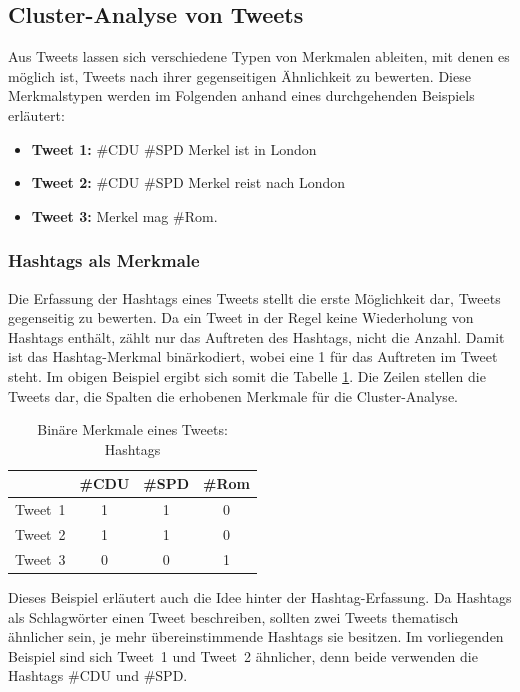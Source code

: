 \subsection{Cluster-Analyse von Tweets} \label{subsec:ClusterTweets}

Aus Tweets lassen sich verschiedene Typen von Merkmalen ableiten, mit denen es möglich ist, 
Tweets nach ihrer gegenseitigen Ähnlichkeit zu bewerten. Diese Merkmalstypen werden im Folgenden anhand eines durchgehenden Beispiels erläutert:
\begin{itemize}
\item \textbf{Tweet 1:} \#CDU \#SPD Merkel ist in London
\item \textbf{Tweet 2:} \#CDU \#SPD Merkel reist nach London
\item \textbf{Tweet 3:} Merkel mag \#Rom.
\end{itemize}

\subsubsection{Hashtags als Merkmale}\label{subsec:HashtagsAlsMerkmale}
Die Erfassung der Hashtags eines Tweets stellt die erste Möglichkeit dar, Tweets gegenseitig zu bewerten. 
Da ein Tweet in der Regel keine Wiederholung von Hashtags enthält, 
zählt nur das Auftreten des Hashtags, nicht die Anzahl. 
Damit ist das Hashtag-Merkmal binärkodiert, wobei eine 1 für das Auftreten im Tweet steht. 
Im obigen Beispiel ergibt sich somit die Tabelle \ref{fig:ClusterTab1}. 
Die Zeilen stellen die Tweets dar, die Spalten die erhobenen Merkmale für die Cluster-Analyse.

\begin{table}[ht]
\centering
\begin{tabular}{cccc}
\toprule
 & \#CDU & \#SPD &  \#Rom \\ 
\midrule
Tweet~1 & 1 & 1  & 0 \\ 
 
Tweet~2 & 1 & 1  & 0 \\ 
 
Tweet~3 & 0 & 0  & 1 \\ 
\bottomrule 
\end{tabular} 
\caption{Binäre Merkmale eines Tweets: Hashtags}
\label{fig:ClusterTab1}
\end{table}

Dieses Beispiel erläutert auch die Idee hinter der Hashtag-Erfassung. 
Da Hashtags als Schlagwörter einen Tweet beschreiben, sollten zwei Tweets 
thematisch ähnlicher sein, je mehr übereinstimmende Hashtags sie besitzen.
Im vorliegenden Beispiel sind sich Tweet~1 und Tweet~2 ähnlicher, 
denn beide verwenden die Hashtags \glqq \#CDU\grqq{} und \glqq \#SPD\grqq{}. 

